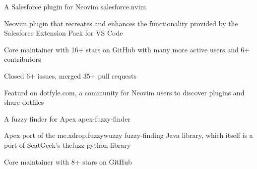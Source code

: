 

\begin{cventries}

  \cventry
    {A Salesforce plugin for Neovim} 
    {salesforce.nvim} 
    {} %
    {} %
    {
      \begin{cvitems} %
        \item {Neovim plugin that recreates and enhances the functionality provided by the Salesforce Extension Pack for VS Code}
        \item {Core maintainer with 16+ stars on GitHub with many more active users and 6+ contributors}
        \item {Closed 6+ issues, merged 35+ pull requests}
        \item {Featurd on dotfyle.com, a community for Neovim users to discover plugins and share dotfiles}
      \end{cvitems}
    }

  \cventry
    {A fuzzy finder for Apex} 
    {apex-fuzzy-finder} 
    {} %
    {} %
    {
      \begin{cvitems} %
        \item {Apex port of the me.xdrop.fuzzywuzzy fuzzy-finding Java library, which itself is a port of SeatGeek's thefuzz python library}
        \item {Core maintainer with 8+ stars on GitHub}
      \end{cvitems}
    }

\end{cventries}
